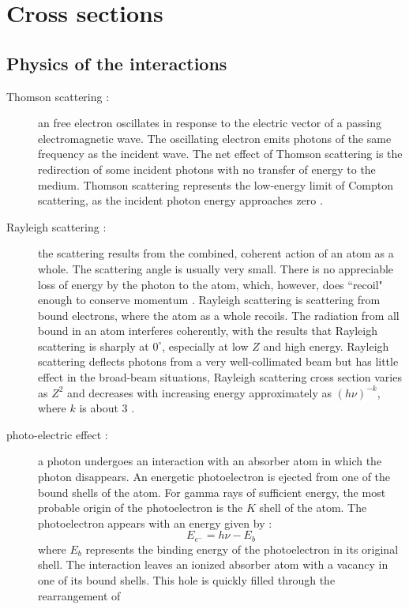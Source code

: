 \section{Cross sections}
\subsection{Physics of the interactions}

\begin{description}
\item [Thomson scattering :] an free electron oscillates in response to the 
electric vector of a passing electromagnetic wave. The oscillating electron 
emits photons of the same frequency as the incident wave. The net effect of 
Thomson scattering is the redirection of
some incident photons with no transfer of energy to the medium. Thomson
scattering represents the low-energy limit of Compton scattering, as the
incident photon energy approaches zero \cite{radiation}.
\item [Rayleigh scattering :] the scattering results from the combined,
coherent action of an atom as a whole. The scattering angle is usually very
small. There is no appreciable loss of energy by the photon to the atom,
which, however, does ``recoil" enough to conserve momentum \cite{radiation}.
Rayleigh scattering is scattering from bound electrons, where the atom as a
whole recoils. The radiation from all bound in an atom interferes coherently,
with the results that Rayleigh scattering is sharply at $0^{\circ}$,
especially at low $Z$ and high energy. Rayleigh scattering deflects photons from
a very well-collimated beam but has little effect in the broad-beam
situations, Rayleigh scattering cross section varies as $Z^2$ and decreases
with increasing energy approximately as $(h \nu)^{-k}$, where $k$ is about 3
\cite{shielding}.
\item [photo-electric effect :] a photon undergoes an interaction with an
absorber atom in which the photon disappears. An energetic photoelectron is
ejected from one of the bound shells of the atom. For gamma rays of
sufficient energy, the most probable origin of the photoelectron is the $K$
shell of the atom. The photoelectron appears with an energy given by :
\begin{equation}
E_{e^-} = h\nu -E_b
\end{equation}
where $E_b$ represents the binding energy of the photoelectron in its original
shell. The interaction leaves an ionized absorber atom with a vacancy in one
of its bound shells. This hole is quickly filled through the rearrangement of

\end{description}

